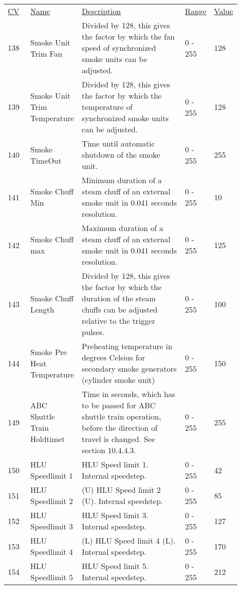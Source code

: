 \begin{tabular}{p{0.1\linewidth} p{0.15\linewidth} p{0.5\linewidth} p{0.1\linewidth} p{0.1\linewidth}} 
\underline{CV} & \underline{Name} &  \underline{Description} & \underline{Range} & \underline{Value}\\


138 & Smoke Unit Trim Fan & Divided by 128, this gives the factor by which the fan speed of synchronized smoke units can be adjusted. & 0 - 255 & 128\\
139 & Smoke Unit Trim Temperature & Divided by 128, this gives the factor by which the temperature of synchronized smoke units can be adjusted. & 0 - 255 & 128\\
140 & Smoke TimeOut & Time until automatic shutdown of the smoke unit. & 0 - 255 & 255\\

141 & Smoke Chuff Min & Minimum duration of a steam chuff of an external smoke unit in 0.041 seconds resolution. & 0 - 255 & 10\\
142 & Smoke Chuff max & Maximum duration of a steam chuff of an external smoke unit in 0.041 seconds resolution. & 0 - 255 & 125\\
143 & Smoke Chuff Length & Divided by 128, this gives the factor by which the duration of the steam chuffs can be adjusted relative to the trigger pulses. & 0 - 255 & 100\\
144 & Smoke Pre Heat Temperature & Preheating temperature in degrees Celsius for secondary smoke generators (cylinder smoke unit) & 0 - 255 & 150\\
149 & ABC Shuttle Train Holdtimet & Time in seconds, which has to be passed for ABC shuttle train operation, before the direction of travel is changed. See section 10.4.4.3. & 0 - 255 & 255\\
150 & HLU Speedlimit 1 & HLU Speed limit 1. Internal speedstep. & 0 - 255 & 42\\
151 & HLU Speedlimit 2 &  (U) HLU Speed limit 2 (U). Internal speedstep. & 0 - 255 & 85\\
152 & HLU Speedlimit 3 & HLU Speed limit 3. Internal speedstep. & 0 - 255 & 127\\
153 & HLU Speedlimit 4 & (L) HLU Speed limit 4 (L). Internal speedstep. & 0 - 255 & 170\\
154 & HLU Speedlimit 5 & HLU Speed limit 5. Internal speedstep. & 0 - 255 & 212\\


\end{tabular}
